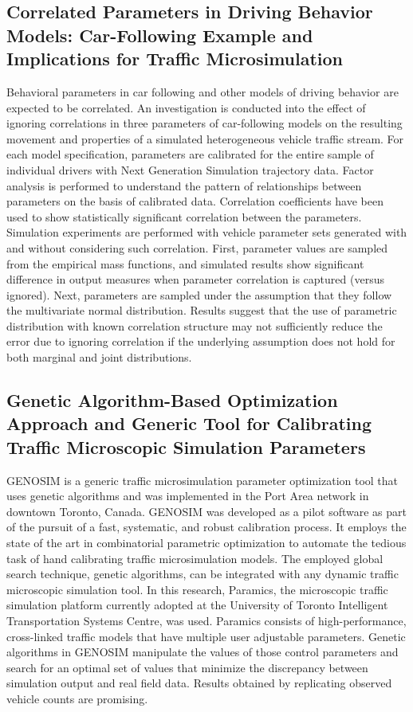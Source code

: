 \documentclass{article}
\begin{document}
\subsection*{Correlated Parameters in Driving Behavior Models: Car-Following Example and Implications for Traffic Microsimulation \cite{correlateCalib}
}
Behavioral parameters in car following and other models of driving behavior are expected to be correlated. An investigation is conducted into the effect of ignoring correlations in three parameters of car-following models on the resulting movement and properties of a simulated heterogeneous vehicle traffic stream. For each model specification, parameters are calibrated for the entire sample of individual drivers with Next Generation Simulation trajectory data. Factor analysis is performed to understand the pattern of relationships between parameters on the basis of calibrated data. Correlation coefficients have been used to show statistically significant correlation between the parameters. Simulation experiments are performed with vehicle parameter sets generated with and without considering such correlation. First, parameter values are sampled from the empirical mass functions, and simulated results show significant difference in output measures when parameter correlation is captured (versus ignored). Next, parameters are sampled under the assumption that they follow the multivariate normal distribution. Results suggest that the use of parametric distribution with known correlation structure may not sufficiently reduce the error due to ignoring correlation if the underlying assumption does not hold for both marginal and joint distributions.


\subsection*{Genetic Algorithm-Based Optimization Approach and Generic Tool for Calibrating Traffic Microscopic Simulation Parameters \cite{geneticCalib}
}
GENOSIM is a generic traffic microsimulation parameter optimization tool that uses genetic algorithms and was implemented in the Port Area network in downtown Toronto, Canada. GENOSIM was developed as a pilot software as part of the pursuit of a fast, systematic, and robust calibration process. It employs the state of the art in combinatorial parametric optimization to automate the tedious task of hand calibrating traffic microsimulation models. The employed global search technique, genetic algorithms, can be integrated with any dynamic traffic microscopic simulation tool. In this research, Paramics, the microscopic traffic simulation platform currently adopted at the University of Toronto Intelligent Transportation Systems Centre, was used. Paramics consists of high-performance, cross-linked traffic models that have multiple user adjustable parameters. Genetic algorithms in GENOSIM manipulate the values of those control parameters and search for an optimal set of values that minimize the discrepancy between simulation output and real field data. Results obtained by replicating observed vehicle counts are promising.
\end{document}
